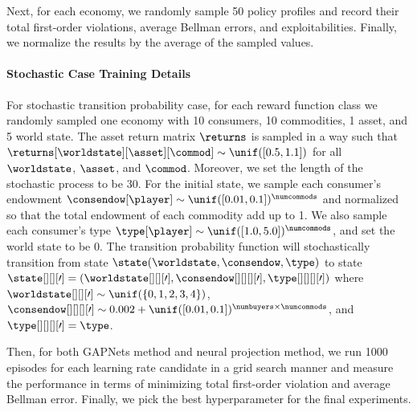 Next, for each economy, we randomly sample 50 policy profiles and record their total first-order violations, average Bellman errors, and exploitabilities. Finally, we normalize the results by the average of the sampled values.


\paragraph{Stochastic Case Training Details}
For stochastic transition probability case, for each reward function class
we randomly sampled one economy with 10 consumers, 10 commodities, 1 asset, and 5 world state. The asset return matrix $\returns$
is sampled in a way such that $\returns[\worldstate][\asset][\commod]\sim \unif([0.5, 1.1])$ for all $\worldstate$, $\asset$, and $\commod$. Moreover, we set the length of the stochastic process to be 30.
For the initial state, we sample each consumer's endowment $\consendow[\player]\sim \unif([0.01, 0.1])^\numcommods$ and normalized so that the total endowment of each commodity add up to 1. We also sample each consumer's type $\type[\player]\sim \unif([1.0, 5.0])^\numcommods$, and set the world state to be 0. 
The transition probability function will stochastically transition from state $\state(\worldstate, \consendow, \type)$
to state $\state[][][\prime]=(\worldstate[][][\prime], \consendow[][][][\prime], \type[][][][\prime])$ where $\worldstate[][][\prime]\sim \unif(\{0,1,2,3,4\})$, $\consendow[][][][\prime]\sim 0.002+\unif([0.01, 0.1])^{\numbuyers\times \numcommods}$, and $\type[][][][\prime]=\type$. 

Then, for both GAPNets method and neural projection method, we run 1000 episodes for each learning rate candidate in a grid search manner and measure the performance in terms of minimizing total first-order violation and average Bellman error. Finally, we pick the best hyperparameter for the final experiments. 

